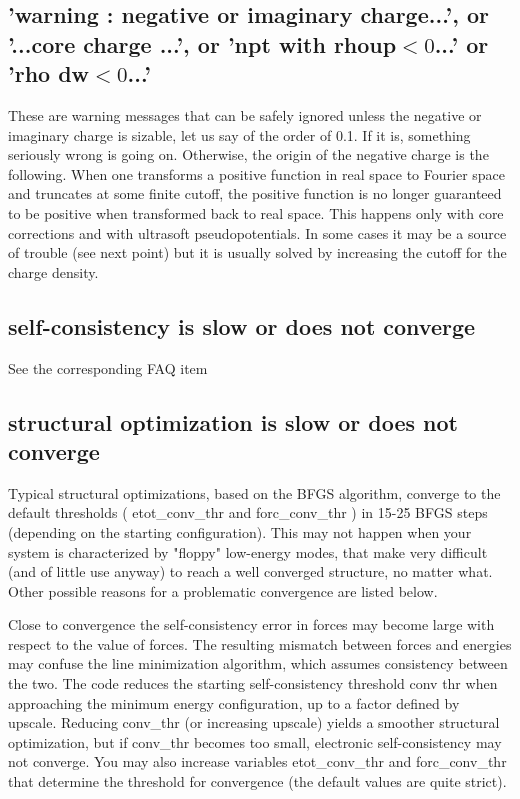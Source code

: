 \documentclass[12pt,a4paper]{article}
\begin{document}
\subsection{'warning : negative or imaginary charge...', or '...core
  charge ...', or 'npt with rhoup$<0$...' or 'rho dw$<0$...'} 
These are warning messages that can be safely ignored unless the
negative or imaginary charge is sizable, let us say of the order of
0.1. If it is, something seriously wrong is going on. Otherwise, the
origin of the negative charge is the following. When one transforms a
positive function in real space to Fourier space and truncates at some
finite cutoff, the positive function is no longer guaranteed to be
positive when transformed back to real space. This happens only with
core corrections and with ultrasoft pseudopotentials. In some cases it
may be a source of trouble (see next point) but it is usually solved
by increasing the cutoff for the charge density.

\subsection{self-consistency is slow or does not converge}
See the corresponding FAQ item

\subsection{structural optimization is slow or does not converge}
Typical structural optimizations, based on the BFGS algorithm,
converge to the default thresholds ( etot\_conv\_thr and
forc\_conv\_thr ) in 15-25 BFGS steps (depending on the 
starting configuration). This may not happen when your
system is characterized by "floppy" low-energy modes, that make very
difficult (and of little use anyway) to reach a well converged structure, no
matter what. Other possible reasons for a problematic convergence are listed
below.
    
Close to convergence the self-consistency error in forces may become large
with respect to the value of forces. The resulting mismatch between forces
and energies may confuse the line minimization algorithm, which assumes
consistency between the two. The code reduces the starting self-consistency
threshold conv thr when approaching the minimum energy configuration, up
to a factor defined by upscale. Reducing conv\_thr (or increasing upscale)
yields a smoother structural optimization, but if conv\_thr becomes too small,
electronic self-consistency may not converge. You may also increase variables
etot\_conv\_thr and forc\_conv\_thr that determine the threshold for
convergence (the default values are quite strict).
    
\end{document}

